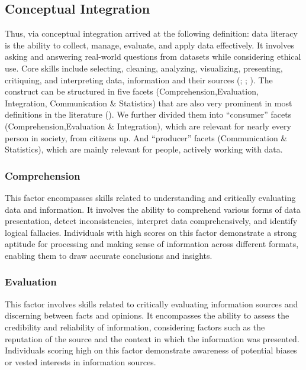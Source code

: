 \documentclass[
  12pt,
  a4paper,
  twoside]{article}
\begin{document}
\subsection{Conceptual Integration}\label{conceptual-integration}

Thus, via conceptual integration arrived at the following definition: data literacy is the ability to collect, manage, evaluate, and apply data effectively. It involves asking and answering real-world questions from datasets while considering ethical use. Core skills include selecting, cleaning, analyzing, visualizing, presenting, critiquing, and interpreting data, information and their sources (; ; ).
The construct can be structured in five facets (Comprehension,Evaluation, Integration, Communication \& Statistics) that are also very prominent in most definitions in the literature (). We further divided them into ``consumer'' facets (Comprehension,Evaluation \& Integration), which are relevant for nearly every person in society, from citizens up. And ``producer'' facets (Communication \& Statistics), which are mainly relevant for people, actively working with data.

\subsubsection{Comprehension}\label{comprehension}

This factor encompasses skills related to understanding and critically evaluating data and information. It involves the ability to comprehend various forms of data presentation, detect inconsistencies, interpret data comprehensively, and identify logical fallacies. Individuals with high scores on this factor demonstrate a strong aptitude for processing and making sense of information across different formats, enabling them to draw accurate conclusions and insights.

\subsubsection{Evaluation}\label{evaluation}

This factor involves skills related to critically evaluating information sources and discerning between facts and opinions. It encompasses the ability to assess the credibility and reliability of information, considering factors such as the reputation of the source and the context in which the information was presented. Individuals scoring high on this factor demonstrate awareness of potential biases or vested interests in information sources.
\end{document}
